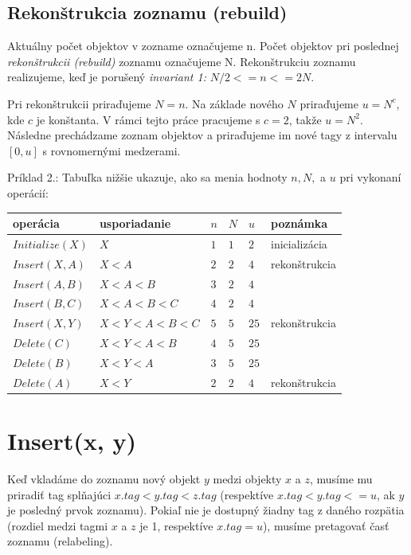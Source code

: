 \documentclass[
  digital,     %
  oneside,     %
  nosansbold,  %
  nocolorbold, %
  lof,         %
  lot,         %
]{fithesis4}
\begin{document}
\subsection*{Rekonštrukcia zoznamu (rebuild)}

Aktuálny počet objektov v zozname označujeme n. Počet objektov pri poslednej \textit{rekonštrukcii (rebuild)} zoznamu označujeme N. Rekonštrukciu zoznamu realizujeme, keď je porušený \textit{invariant 1:} $N/2 <= n <= 2N$.

Pri rekonštrukcii priraďujeme $N = n$. Na základe nového $N$ priraďujeme $u = N^c$, kde $c$ je konštanta. V rámci tejto práce pracujeme s $c = 2$, takže $u = N^2$. Následne prechádzame zoznam objektov a priraďujeme im nové tagy z intervalu $[0, u]$ s rovnomernými medzerami.

Príklad 2.:
Tabuľka nižšie ukazuje, ako sa menia hodnoty $n, N,$ a $u$ pri vykonaní operácií:
\begin{table}
\begin{tabularx}{\textwidth}{| l | l | l | l | l | l}
    operácia & usporiadanie & $n$ & $N$ & $u$ & poznámka \\
    \midrule
    $Initialize(X)$ & $X$ & $1$ & $1$ & $2$ & inicializácia\\
    $Insert(X, A)$ & $X < A$ & $2$ & $2$ & $4$ & rekonštrukcia\\
    $Insert(A, B)$ & $X < A < B$ & $3$ & $2$ & $4$ & \\
    $Insert(B, C)$ & $X < A < B < C$ & $4$ & $2$ & $4$ & \\
    $Insert(X, Y)$ & $X < Y < A < B < C$ & $5$ & $5$ & $25$ & rekonštrukcia\\
    $Delete(C)$ & $X < Y < A < B$ & $4$ & $5$ & $25$ & \\
    $Delete(B)$ & $X < Y < A $ & $3$ & $5$ & $25$ & \\
    $Delete(A)$ & $X < Y$ & $2$ & $2$ & $4$ & rekonštrukcia\\
  \end{tabularx}
\end{table}


\section{Insert(x, y)}

Keď vkladáme do zoznamu nový objekt $y$ medzi objekty $x$ a $z$, musíme mu priradiť tag splňajúci $x.tag < y.tag < z.tag$ (respektíve $x.tag < y.tag <= u$, ak $y$ je posledný prvok zoznamu).
Pokiaľ nie je dostupný žiadny tag z daného rozpätia (rozdiel medzi tagmi $x$ a $z$ je 1, respektíve $x.tag = u$), musíme pretagovať časť zoznamu (relabeling).
\end{document}
